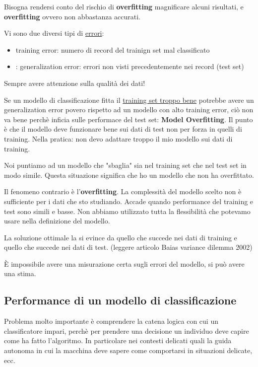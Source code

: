 Bisogna rendersi conto del rischio di \textbf{overfitting} magnificare alcuni risultati, e \textbf{overfitting} ovvero non abbastanza accurati.

Vi sono due diversi tipi di \underline{errori}:
\begin{itemize}
	\item training error: numero di record del trainign set mal classificato
	\item: generalization error: errori non visti precedentemente nei record (test set)
\end{itemize}

Sempre avere attenzione sulla qualit\`a dei dati! 

Se un modello di classificazione fitta il \underline{training set troppo bene} potrebbe avere un generalization error povero rispetto ad un modello con alto training error, ciò non va bene perch\`e inficia sulle performace del test set: \textbf{Model Overfitting}. Il punto \`e che il modello deve funzionare bene sui dati di test non per forza in quelli di training. Nella pratica: non devo adattare troppo il mio modello sui dati di training. 

Noi puntiamo ad un modello che "sbaglia" sia nel training set che nel test set in modo simile. Questa situazione significa che ho un modello che non ha overfittato. 

Il fenomeno contrario \`e l'\textbf{overfitting}. La complessit\`a del modello scelto non \`e sufficiente per i dati che sto studiando. Accade quando performance del training e test sono simili e basse. Non abbiamo utilizzato tutta la flessibilit\`a che potevamo usare nella definizione del modello.

La soluzione ottimale la si evince da quello che succede nei dati di training e quello che succede nei dati di test. (leggere articolo Baias variance dilemma 2002)

\`E impossibile avere una misurazione certa sugli errori del modello, si pu\`o avere una stima. 

\subsection{Performance di un modello di classificazione}
Problema molto importante \`e comprendere la catena logica con cui un classificatore impari, perch\`e per prendere una decisione un individuo deve capire come ha fatto l'algoritmo. In particolare nei contesti delicati quali la guida autonoma in cui la macchina deve sapere come comportarsi in situazioni delicate, ecc. 

